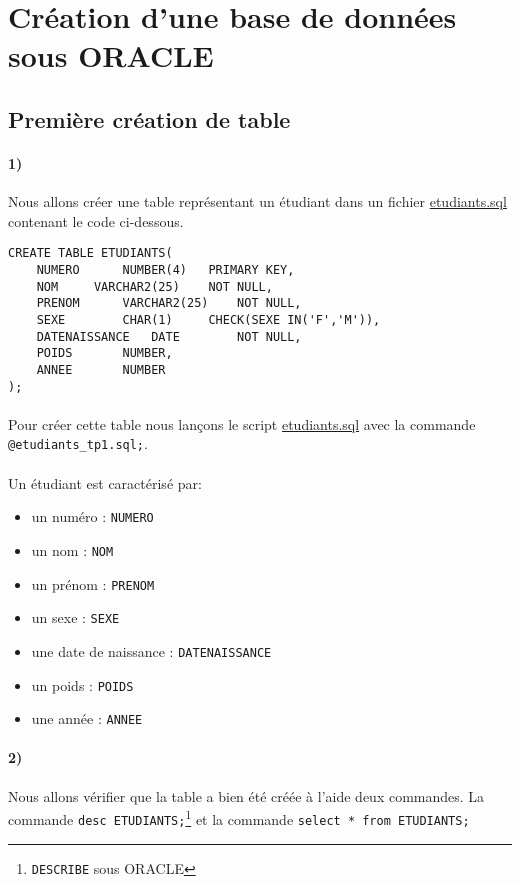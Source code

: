 \documentclass{report}
\begin{document}
\section{Création d'une base de données sous ORACLE}

\subsection{Première création de table}

\paragraph{1)}Nous allons créer une table représentant un étudiant dans un fichier \href{./TP1/etudiants_tp1.sql}{etudiants.sql} contenant le code ci-dessous.

\begin{lstlisting}
CREATE TABLE ETUDIANTS(
	NUMERO		NUMBER(4)	PRIMARY KEY,
	NOM		VARCHAR2(25)	NOT NULL,
	PRENOM		VARCHAR2(25)	NOT NULL,
	SEXE		CHAR(1)		CHECK(SEXE IN('F','M')),
	DATENAISSANCE	DATE		NOT NULL,
	POIDS 		NUMBER,
	ANNEE 		NUMBER
);
\end{lstlisting}

\paragraph{}Pour créer cette table nous lançons le script \href{./TP1/etudiants_tp1.sql}{etudiants.sql} avec la commande {\tt @etudiants\_tp1.sql;}.

\paragraph{}Un étudiant est caractérisé par:
\begin{itemize}
  \item un numéro : {\tt NUMERO}
  \item un nom : {\tt NOM}
  \item un prénom : {\tt PRENOM}
  \item un sexe : {\tt SEXE}
  \item une date de naissance : {\tt DATENAISSANCE}
  \item un poids : {\tt POIDS}
  \item une année : {\tt ANNEE}
\end{itemize}

\paragraph{2)}Nous allons vérifier que la table a bien été créée à l'aide deux commandes.
La commande {\tt desc ETUDIANTS;}\footnote{{\tt DESCRIBE} sous ORACLE} et la commande {\tt select * from ETUDIANTS;}
\end{document}
